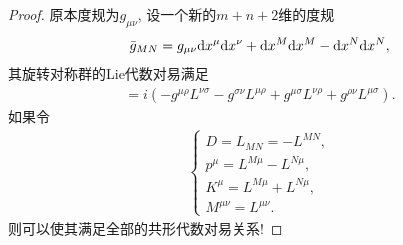 \begin{proof}
    原本度规为$g_{\mu\nu}$, 设一个新的$m+n+2$维的度规
    \begin{align}
        \bar g_{MN}=g_{\mu\nu}\mathrm dx^\mu\mathrm dx^\nu+\mathrm dx^M\mathrm dx^M-\mathrm dx^N\mathrm dx^N,
    \end{align}
    其旋转对称群的Lie代数对易满足
    \begin{align}
        [L^{\mu\nu}, L^{\rho\sigma}]=i(-g^{\mu\rho}L^{\nu\sigma}-g^{\sigma\nu}L^{\mu\rho}+g^{\mu\sigma}L^{\nu\rho}+g^{\rho\nu}L^{\mu\sigma}).
    \end{align}
    如果令
    \begin{align}
        \begin{cases}
            D=L_{MN}=-L^{MN},\\
            p^\mu=L^{M\mu}-L^{N\mu},\\
            K^\mu=L^{M\mu}+L^{N\mu},\\
            M^{\mu\nu}=L^{\mu\nu}.
        \end{cases}
    \end{align}
    则可以使其满足全部的共形代数对易关系!
\end{proof}